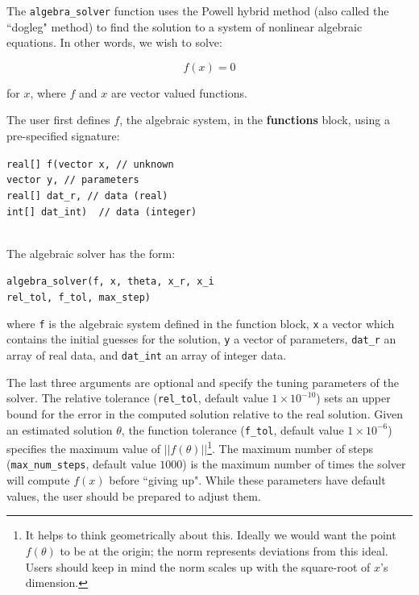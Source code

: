 \documentclass[11pt]{amsart}
\begin{document}
The \texttt{algebra\_solver} function uses the Powell hybrid method (also called the ``dogleg" method)\cite{dogleg} to find the solution to a system of nonlinear algebraic equations. In other words, we wish to solve:

$$ f(x) = 0 $$

for $x$, where $f$ and $x$ are vector valued functions.

The user first defines $f$, the algebraic system, in the \textbf{functions} block, using a pre-specified signature:

\texttt{real[] f(vector x,  // unknown  \\
\phantom{real[] f} vector y,  // parameters  \\
\phantom{real[] f} real[] dat\_r,  // data (real)  \\
\phantom{real[] f} int[] dat\_int) {  // data (integer)  \\	        
  }  \\
}



The algebraic solver has the form: 

\texttt{algebra\_solver(f,  x, theta,  x\_r, x\_i \\                              
\phantom{algebra\_solver} rel\_tol, f\_tol, max\_step)}

where \texttt{f} is the algebraic system defined in the function block, \texttt{x} a vector which contains the initial guesses for the solution, \texttt{y} a vector of parameters, \texttt{dat\_r} an array of real data, and \texttt{dat\_int} an array of integer data.

The last three arguments are optional and specify the tuning parameters of the solver. The relative tolerance (\texttt{rel\_tol}, default value $1 \times 10^{-10}$) sets an upper bound for the error in the computed solution relative to the real solution. Given an estimated solution $\theta$, the function tolerance (\texttt{f\_tol}, default value $1 \times 10^{-6}$) specifies the maximum value of $||f(\theta)||$\footnote{It helps to think geometrically about this. Ideally we would want the point $f(\theta)$ to be at the origin; the norm represents deviations from this ideal. Users should keep in mind the norm scales up with the square-root of $x$'s dimension.}. The maximum number of steps (\texttt{max\_num\_steps}, default value $1000$) is the maximum number of times the solver will compute $f(x)$ before ``giving up". While these parameters have default values, the user should be prepared to adjust them.
\end{document}
